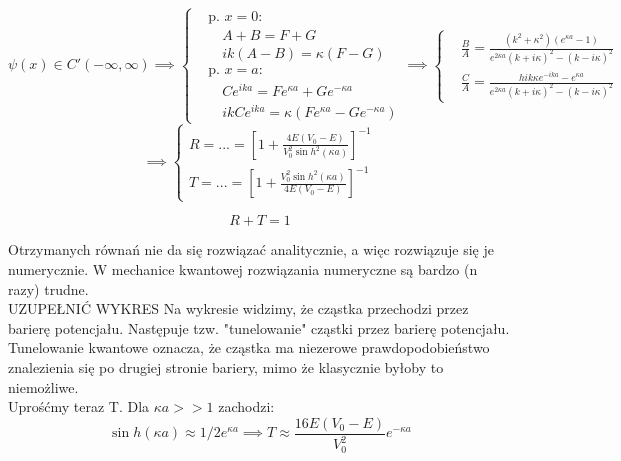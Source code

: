 \begin{equation*}
    \psi(x) \in C'(-\infty, \infty) \implies
    \left\{
    \begin{aligned}
      &\text{p. } x=0: \\
      &\quad A + B = F + G \\
      &\quad ik(A - B) = \kappa (F - G) \\[1.5ex]
      &\text{p. } x=a: \\
      &\quad C e^{ika} = F e^{\kappa a} + G e^{-\kappa a} \\
      &\quad ikC e^{ika} = \kappa (F e^{\kappa a} - G e^{-\kappa a})
    \end{aligned}
    \right.
    \implies
    \left\{
    \begin{aligned}
      &\frac{B}{A} = \frac{(k^2 + \kappa^2)(e^{\kappa a} - 1)}{e^{2\kappa a}(k + i\kappa)^2 - (k - i\kappa)^2} \\
      &\frac{C}{A} = \frac{h i k \kappa e^{-ika} - e^{\kappa a}}{e^{2\kappa a}(k + i\kappa)^2 - (k - i\kappa)^2}
    \end{aligned}
    \right.
\end{equation*}
%
\begin{equation*}
    \implies
    \begin{cases}
        R = ... = \left[ 1 + \frac{4 E (V_0 - E)}{V_0^2 \sin h^2(\kappa a)} \right] ^{-1} \\
        T = ... = \left[ 1 + \frac{V_0^2 \sin h^2(\kappa a)}{4 E (V_0 - E)} \right] ^{-1}
    \end{cases}
\end{equation*}

\begin{equation*}
    R + T = 1
\end{equation*}


Otrzymanych równań nie da się rozwiązać analitycznie, a więc rozwiązuje się je numerycznie. W mechanice kwantowej rozwiązania
numeryczne są bardzo (n razy) trudne. \\

{{ UZUPEŁNIĆ WYKRES }}
Na wykresie widzimy, że cząstka przechodzi przez barierę potencjału. Następuje tzw. "tunelowanie" cząstki przez barierę potencjału.
Tunelowanie kwantowe oznacza, że cząstka ma niezerowe prawdopodobieństwo znalezienia się po drugiej stronie bariery,
mimo że klasycznie byłoby to niemożliwe.\\

Uprośćmy teraz T. Dla $\kappa a >> 1$ zachodzi:
\begin{equation*}
    \sin h(\kappa a) \approx 1 / 2 e^{\kappa a} \implies T \approx \frac{16 E (V_0 - E)}{V_0^2} e^{- \kappa a}
\end{equation*}


